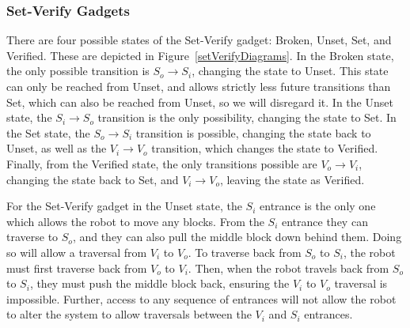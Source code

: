 %
\subsubsection{Set-Verify Gadgets}
\label{sec:SetVerifyGadgets}
There are four possible states of the Set-Verify gadget: Broken, Unset, Set, and Verified. These are depicted in Figure~\ref{setVerifyDiagrams}. In the Broken state, the only possible transition is $S_o \rightarrow S_i$, changing the state to Unset. This state can only be reached from Unset, and allows strictly less future transitions than Set, which can also be reached from Unset, so we will disregard it. In the Unset state, the $S_i \rightarrow S_o$ transition is the only possibility, changing the state to Set. In the Set state, the $S_o \rightarrow S_i$ transition is possible, changing the state back to Unset, as well as the $V_i \rightarrow V_o$ transition, which changes the state to Verified. Finally, from the Verified state, the only transitions possible are $V_o \rightarrow V_i$, changing the state back to Set, and $V_i \rightarrow V_o$, leaving the state as Verified.

For the Set-Verify gadget in the Unset state, the $S_i$ entrance is the only one which allows the robot to move any blocks. From the $S_i$ entrance they can traverse to $S_o$, and they can also pull the middle block down behind them. Doing so will allow a traversal from $V_i$ to $V_o$. To traverse back from $S_o$ to $S_i$, the robot must first traverse back from $V_o$ to $V_i$. Then, when the robot travels back from $S_o$ to $S_i$, they must push the middle block back, ensuring the $V_i$ to $V_o$ traversal is impossible. Further, access to any sequence of entrances will not allow the robot to alter the system to allow traversals between the $V_i$ and $S_i$ entrances. 

